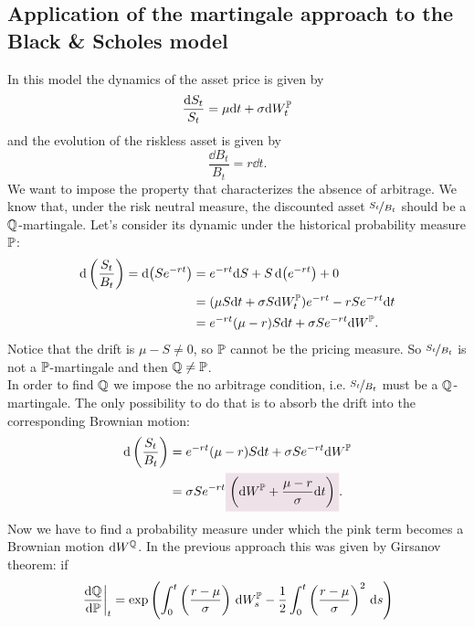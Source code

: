 \subsection[Application to the Black \& Scholes model]{Application of the martingale approach to the Black \& Scholes model}
In this model the dynamics of the asset price is given by
\begin{equation}\label{s}
    \dfrac{\dd S_t}{S_t} = \mu \dd t + \sigma \dd W_t^{\mathbb{P}}
\end{equation}
and the evolution of the riskless asset is given by
\begin{equation}
    \dfrac{\dd B_t}{B_t} = r \dd t.
\end{equation}
We want to impose the property that characterizes the absence of arbitrage. We know that, under the risk neutral measure, the discounted asset $\nicefrac{S_t}{B_t}$ should be a $\mathbb{Q}$-martingale. Let's consider its dynamic under the historical probability measure $\mathbb{P}$:
\begin{align}
    \dd\left(\frac{S_t}{B_t}\right) = \dd (Se^{-rt}) &= e^{-rt}\dd S + S\dd(e^{-rt}) + 0 \\
    &=
    (\mu S \dd t + \sigma S \dd W_t^{\mathbb{P}})e^{-rt} - rSe^{-rt} \dd t \\
    &=
    e^{-rt}(\mu - r)S\dd t + \sigma Se^{-rt} \dd W^{\mathbb{P}}.
\end{align}
Notice that the drift is $\mu-S\ne0$, so $\mathbb{P}$ cannot be the pricing measure. So $\nicefrac{S_t}{B_t}$ is not a $\mathbb{P}$-martingale and then $\mathbb{Q}\ne\mathbb{P}$. \\
In order to find $\mathbb{Q}$ we impose the no arbitrage condition, i.e. $\nicefrac{S_t}{B_t}$ must be a $\mathbb{Q}$-martingale. The only possibility to do that is to absorb the drift into the corresponding Brownian motion:
\begin{align}\label{drift}
    \notag \dd\left(\frac{S_t}{B_t}\right) &= e^{-rt}(\mu - r)S\dd t + \sigma Se^{-rt} \dd W^{\Pmeas}\\
    &=
    \sigma S e^{-rt}\hlc{mypink}{\left(\dd W^{\Pmeas} + \frac{\mu-r}{\sigma}\dd t\right)}.
\end{align}
Now we have to find a probability measure under which the pink term becomes a Brownian motion $\dd W^{\mathbb{Q}}$. In the previous approach this was given by Girsanov theorem: if
\begin{equation}\label{gis}
    \eval{\dv{\mathbb{Q}}{\mathbb{P}}}_t = \exp\left(\int^t_0 \left(\frac{r-\mu}{\sigma}\right)\,\dd W_s^{\mathbb{P}}-\dfrac{1}{2}\int^t_0 \left(\frac{r-\mu}{\sigma}\right)^2 \,\dd s\right)
\end{equation}
